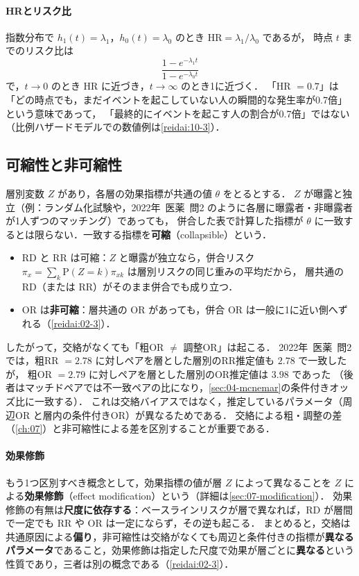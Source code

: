 \documentclass[a4paper,11pt,openany]{ltjsbook}
\newcommand{\tagbox}[2]{\tcbox[on line,boxsep=0.5pt,left=2pt,right=2pt,top=0.5pt,bottom=0.5pt,
  colframe=#1,colback=#1!10,boxrule=0.4pt,arc=1pt]{\scriptsize\bfseries\textcolor{#1}{#2}}}
\newcommand{\Youchui}{\tagbox{bkpurple}{要注意}}
\newcommand{\kakomon}[2]{\mbox{#1年 医薬 問#2}}
\newcommand{\Prob}{\mathrm{P}}
\newcommand{\HR}{\mathrm{HR}}
\newcommand{\emphx}[1]{\textbf{\textcolor{bkblue}{#1}}}
\begin{document}
\paragraph{HRとリスク比}
指数分布で $h_1(t)=\lambda_1$，$h_0(t)=\lambda_0$ のとき $\HR=\lambda_1/\lambda_0$ であるが，
時点 $t$ までのリスク比は
\[
\frac{1-e^{-\lambda_1t}}{1-e^{-\lambda_0t}}
\]
で，$t\to0$ のとき $\HR$ に近づき，$t\to\infty$ のとき1に近づく．
「HR $=0.7$」は「どの時点でも，まだイベントを起こしていない人の瞬間的な発生率が0.7倍」という意味であって，
「最終的にイベントを起こす人の割合が0.7倍」ではない（比例ハザードモデルでの数値例は\cref{reidai:10-3}）．

\subsection{可縮性と非可縮性}\label{subsec:02-collapse}
\Youchui 層別変数 $Z$ があり，各層の効果指標が共通の値 $\theta$ をとるとする．
$Z$ が曝露と独立（例：ランダム化試験や，\kakomon{2022}{2} のように各層に曝露者・非曝露者が1人ずつのマッチング）であっても，
併合した表で計算した指標が $\theta$ に一致するとは限らない．一致する指標を\emphx{可縮}（collapsible）という．
\begin{itemize}
\item RD と RR は可縮：$Z$ と曝露が独立なら，併合リスク $\pi_x=\sum_k\Prob(Z=k)\pi_{xk}$ は層別リスクの同じ重みの平均だから，
      層共通の RD（または RR）がそのまま併合でも成り立つ．
\item OR は\textbf{非可縮}：層共通の OR があっても，併合 OR は一般に1に近い側へずれる（\cref{reidai:02-3}）．
\end{itemize}
したがって，交絡がなくても「粗OR $\ne$ 調整OR」は起こる．
\kakomon{2022}{2} では，粗RR $=2.78$ に対しペアを層とした層別のRR推定値も $2.78$ で一致したが，
粗OR $=2.79$ に対しペアを層とした層別のOR推定値は $3.98$ であった
（後者はマッチドペアでは不一致ペアの比になり，\cref{sec:04-mcnemar}の条件付きオッズ比に一致する）．
これは交絡バイアスではなく，推定しているパラメータ（周辺OR と層内の条件付きOR）が異なるためである．
交絡による粗・調整の差（\cref{ch:07}）と非可縮性による差を区別することが重要である．

\paragraph{効果修飾}
もう1つ区別すべき概念として，効果指標の値が層 $Z$ によって異なることを $Z$ による\emphx{効果修飾}（effect modification）という（詳細は\cref{sec:07-modification}）．
効果修飾の有無は\textbf{尺度に依存する}：ベースラインリスクが層で異なれば，RD が層間で一定でも RR や OR は一定にならず，その逆も起こる．
まとめると，交絡は共通原因による\textbf{偏り}，非可縮性は交絡がなくても周辺と条件付きの指標が\textbf{異なるパラメータ}であること，効果修飾は指定した尺度で効果が層ごとに\textbf{異なる}という性質であり，三者は別の概念である（\cref{reidai:02-3}）．
\end{document}

